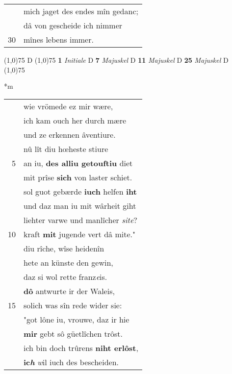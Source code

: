 \documentclass[8pt,a4paper,notitlepage]{article}
\begin{document}
\begin{table}[ht]
\begin{minipage}[t]{0.5\linewidth}
\begin{tabular}{rl}
 & mich jaget des endes mîn gedanc;\\ 
 & dâ von gescheide ich nimmer\\ 
30 & mînes lebens immer.\\ 
\end{tabular}
\scriptsize
\line(1,0){75} \newline
D \newline
\line(1,0){75} \newline
\textbf{1} \textit{Initiale} D  \textbf{7} \textit{Majuskel} D  \textbf{11} \textit{Majuskel} D  \textbf{25} \textit{Majuskel} D  \newline
\line(1,0){75} \newline
\newline
\end{minipage}
\hspace{0.5cm}
\begin{minipage}[t]{0.5\linewidth}
\small
\begin{center}*m
\end{center}
\begin{tabular}{rl}
 & wie vrömede ez mir wære,\\ 
 & ich kam ouch her durch mære\\ 
 & und ze erkennen âventiure.\\ 
 & nû lît diu hœheste stiure\\ 
5 & an iu, \textbf{des alliu getouftiu} diet\\ 
 & mit prîse \textbf{sich} von laster schiet.\\ 
 & sol guot gebærde \textbf{iuch} helfen \textbf{iht}\\ 
 & und daz man iu mit wârheit giht\\ 
 & liehter varwe und manlîcher \textit{site}?\\ 
10 & kraft \textbf{mit} jugende vert dâ mite."\\ 
 & diu rîche, wîse heidenîn\\ 
 & hete an künste den gewin,\\ 
 & daz si wol rette franz\textit{e}is.\\ 
 & \textbf{dô} antwurte ir der Waleis,\\ 
15 & solich was sîn rede wider sie:\\ 
 & "got lône iu, vrouwe, daz ir hie\\ 
 & \textbf{mir} gebt sô güetlîchen trôst.\\ 
 & ich bin doch trûrens \textbf{niht erlôst},\\ 
 & \textbf{ic\textit{h}} \textit{w}il iuch des bescheiden.\\ 

\end{tabular}
\end{minipage}
\end{table}
\end{document}
